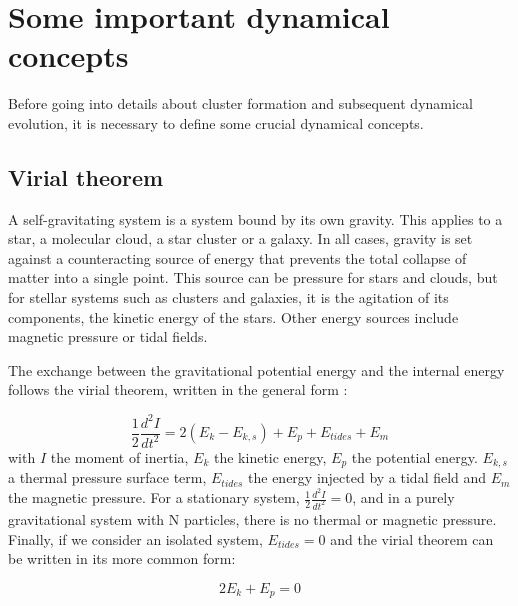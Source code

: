 %


\section{Some important dynamical concepts}

Before going into details about cluster formation and subsequent dynamical evolution, it is necessary to define some crucial dynamical concepts.

\subsection{Virial theorem}

A self-gravitating system is a system bound by its own gravity. This applies to a star, a molecular cloud, a star cluster or a galaxy. In all cases, gravity is set against a counteracting source of energy that prevents the total collapse of matter into a single point. This source can be pressure for stars and clouds, but for stellar systems such as clusters and galaxies, it is the agitation of its components, the kinetic energy of the stars. Other energy sources include magnetic pressure or tidal fields.

The exchange between the gravitational potential energy and the internal energy follows the virial theorem, written in the general form \citep{McKee2007,BT}:

\begin{equation}
\frac{1}{2} \frac{d^2 I}{dt^2} = 2 ( E_k - E_{k,s}) +  E_p + E_{tides} + E_m
\end{equation}
with $I$ the moment of inertia, $E_k$ the kinetic energy, $E_p$ the potential energy. $E_{k,s}$  a thermal pressure surface term, $E_{tides}$ the energy injected by a tidal field and $E_m$ the magnetic pressure. For a stationary system, $\frac{1}{2} \frac{d^2 I}{dt^2} = 0$, and in a purely gravitational system with N particles, there is no thermal or magnetic pressure. Finally, if we consider an isolated system, $E_{tides}=0$ and the virial theorem can be written in its more common form:

\begin{equation}
2 E_k + E_p = 0
\end{equation}

